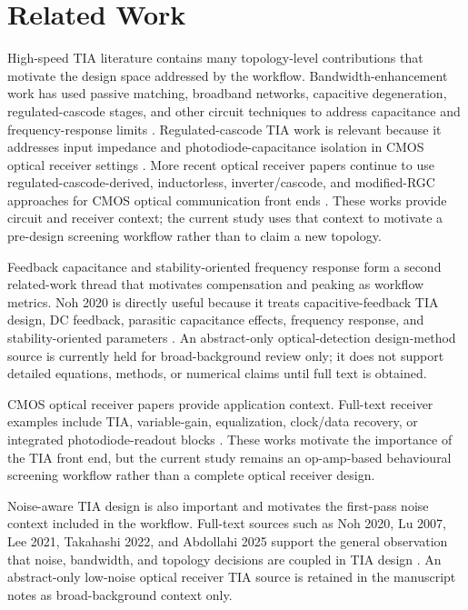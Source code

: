 \section{Related Work}

High-speed TIA literature contains many topology-level contributions that motivate the design space addressed by the workflow. Bandwidth-enhancement work has used passive matching, broadband networks, capacitive degeneration, regulated-cascode stages, and other circuit techniques to address capacitance and frequency-response limits \citep{ANALUI_2004_BW_ENHANCEMENT,LU_2007_BROADBAND_TIA}. Regulated-cascode TIA work is relevant because it addresses input impedance and photodiode-capacitance isolation in CMOS optical receiver settings \citep{PARK_YOO_2004_RGC_TIA}. More recent optical receiver papers continue to use regulated-cascode-derived, inductorless, inverter/cascode, and modified-RGC approaches for CMOS optical communication front ends \citep{XU_2011_INDUCTORLESS_TIA,LEE_2021_4GHZ_SDT_VG_TIA,TAKAHASHI_2022_LOCAL_FEEDBACK_RGC,PAN_LUO_2022_20GBPS_TIA,ABDOLLAHI_2025_MDFRGC_TIA}. These works provide circuit and receiver context; the current study uses that context to motivate a pre-design screening workflow rather than to claim a new topology.

Feedback capacitance and stability-oriented frequency response form a second related-work thread that motivates compensation and peaking as workflow metrics. Noh 2020 is directly useful because it treats capacitive-feedback TIA design, DC feedback, parasitic capacitance effects, frequency response, and stability-oriented parameters \citep{NOH_2020_CF_TIA_DC_LOOP}.
An abstract-only optical-detection design-method source is currently held for broad-background review only; it does not support detailed equations, methods, or numerical claims until full text is obtained.

CMOS optical receiver papers provide application context. Full-text receiver examples include TIA, variable-gain, equalization, clock/data recovery, or integrated photodiode-readout blocks \citep{PAN_2022_26GBPS_RX,MESGARI_2024_MULTI_DOT_PIN_RX}. These works motivate the importance of the TIA front end, but the current study remains an op-amp-based behavioural screening workflow rather than a complete optical receiver design.

Noise-aware TIA design is also important and motivates the first-pass noise context included in the workflow. Full-text sources such as Noh 2020, Lu 2007, Lee 2021, Takahashi 2022, and Abdollahi 2025 support the general observation that noise, bandwidth, and topology decisions are coupled in TIA design \citep{NOH_2020_CF_TIA_DC_LOOP,LU_2007_BROADBAND_TIA,LEE_2021_4GHZ_SDT_VG_TIA,TAKAHASHI_2022_LOCAL_FEEDBACK_RGC,ABDOLLAHI_2025_MDFRGC_TIA}.
An abstract-only low-noise optical receiver TIA source is retained in the manuscript notes as broad-background context only.

